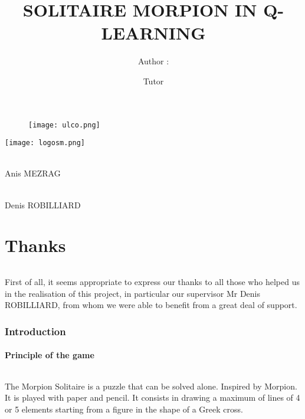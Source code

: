 \documentclass{article}
\begin{document}
\begin{figure}
\centering
\texttt{[image: ulco.png]}
\label{fig:ucp}\\%
\end{figure}


\title{SOLITAIRE MORPION IN Q-LEARNING}
\maketitle


\begin{center}
\centering
\texttt{[image: logosm.png]}
\label{fig:ucp}\\%
\end{center}

\begin{center}
\author{Author :}\\%
Anis MEZRAG 
\end{center}
\begin{center}
\author{Tutor}\\%
Denis ROBILLIARD
\end{center}
 \newpage
    \tableofcontents
\newpage
\part{Thanks}
\paragraph{}
\setlength{\parindent}{2cm}
First of all, it seems appropriate to express our thanks to all those who helped us in the realisation of this project, in particular our supervisor Mr Denis ROBILLIARD, from whom we were able to benefit from a great deal of support.
\newpage
\section{Introduction}
\subsection{Principle of the game}
\paragraph{}
\setlength{\parindent}{2cm}
The Morpion Solitaire is a puzzle that can be solved alone. Inspired by Morpion. It is played with paper and pencil. It consists in drawing a maximum of lines of 4 or 5 elements starting from a figure in the shape of a Greek cross.
\end{document}
